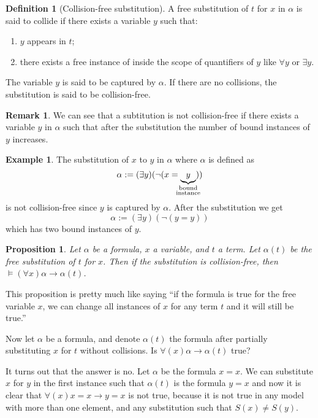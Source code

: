 \documentclass[11pt,a4paper]{article}
\theoremstyle{definition}
\newtheorem{definition}{Definition}[section]
\newtheorem{remark}{Remark}[section]
\newtheorem{example}{Example}[section]
\theoremstyle{plain}
\newtheorem{proposition}[theorem]{Proposition}
\renewcommand{\implies}{\rightarrow}
\begin{document}
  \begin{definition}[Collision-free substitution]
    A free substitution of $t$ for $x$ in $\alpha$ is said to collide 
    if there exists a variable $y$ such that:
    \begin{enumerate}
      \item [(1)] $y$ appears in $t$;
      \item [(2)] there exists a free instance of inside the scope of
        quantifiers of $y$ like $\forall y$ or $\exists y$.
    \end{enumerate}
    The variable $y$ is said to be captured by $\alpha$.
    If there are no collisions, the substitution is said to be 
    collision-free.
  \end{definition}

  \begin{remark}
    We can see that a subtitution is not collision-free if there exists
    a variable $y$ in $\alpha$ such that after the substitution the number
    of bound instances of $y$ increases.
  \end{remark}

  \begin{example}
    The substitution of $x$ to $y$ in $\alpha$ where $\alpha$ is defined
    as
    \[
      \alpha := (\exists y)(\neg (x = \underbrace{y}_{\mathclap{
      \substack{\text{bound} \\ \text{instance}}}}))
    \]
    is not collision-free since $y$ is captured by $\alpha$.
    After the substitution we get
    \[
      \alpha := (\exists y)(\neg (y = y))
    \]
    which has two bound instances of $y$.
  \end{example}

  \begin{proposition}
    Let $\alpha$ be a formula, $x$ a variable, and $t$ a term.
    Let $\alpha(t)$ be the free substitution of $t$ for $x$.
    Then if the substitution is collision-free,
    then $\models (\forall x) \alpha \implies \alpha(t)$.
  \end{proposition}

  This proposition is pretty much like saying ``if the formula is true
  for the free variable $x$, we can change all instances of $x$ for
  any term $t$ and it will still be true.''

  Now let $\alpha$ be a formula, and denote $\alpha(t)$ the formula after
  partially substituting $x$ for $t$ without collisions.
  Is $\forall(x) \alpha \implies \alpha(t)$ true?

  It turns out that the answer is no.
  Let $\alpha$ be the formula $x = x$.
  We can substitute $x$ for $y$ in the first instance such that
  $\alpha(t)$ is the formula $y = x$ and now it is clear that
  $\forall(x) x = x \implies y=x$ is not true,
  because it is not true in any model with more than one element,
  and any substitution such that $S(x) \neq S(y)$.
\end{document}
